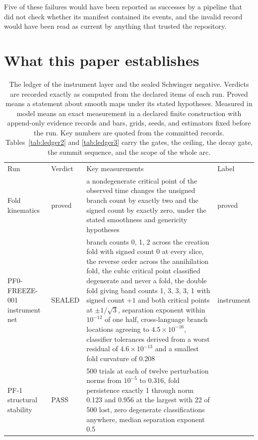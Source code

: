 \documentclass[aps,pre,reprint,nofootinbib,floatfix]{revtex4-2}
\begin{document}
Five of these failures would have been reported as successes by a
pipeline that did not check whether its manifest contained its events,
and the invalid record would have been read as current by anything that
trusted the repository.

\section{What this paper establishes}
\label{sec:claims}

\begin{table}[t]
\caption{The ledger of the instrument layer and the sealed Schwinger
negative.  Verdicts are recorded exactly as computed from the declared
items of each run.  Proved means a statement about smooth maps under
its stated hypotheses.  Measured in model means an exact measurement in
a declared finite construction with append-only evidence records and
bars, grids, seeds, and estimators fixed before the run.  Key numbers
are quoted from the committed records.  Tables~\ref{tab:ledger2} and
\ref{tab:ledger3} carry the gates, the ceiling, the decay gate, the
summit sequence, and the scope of the whole arc.}
\label{tab:ledger}
\begin{ruledtabular}
\footnotesize
\begin{tabular}{L{2.5cm}lL{9.4cm}L{3.0cm}}
Run & Verdict & Key measurements & Label \\
\colrule
Fold kinematics & proved & a nondegenerate critical point of the
observed time changes the unsigned branch count by exactly two and the
signed count by exactly zero, under the stated smoothness and
genericity hypotheses & proved \\
PF0-FREEZE-001 instrument net & SEALED & branch counts 0, 1, 2 across
the creation fold with signed count 0 at every slice, the reverse order
across the annihilation fold, the cubic critical point classified
degenerate and never a fold, the double fold giving band counts 1, 3,
3, 3, 1 with signed count $+1$ and both critical points at
$\pm 1/\sqrt3$, separation exponent within $10^{-12}$ of one half,
cross-language branch locations agreeing to $4.5\times10^{-16}$,
classifier tolerances derived from a worst residual of
$4.6\times10^{-13}$ and a smallest fold curvature of 0.208 &
instrument \\
PF-1 structural stability & PASS & 500 trials at each of twelve
perturbation norms from $10^{-5}$ to 0.316, fold persistence exactly 1
through norm 0.123 and 0.956 at the largest with 22 of 500 lost, zero
degenerate classifications anywhere, median separation exponent 0.5

\end{tabular}
\end{ruledtabular}
\end{table}
\end{document}
